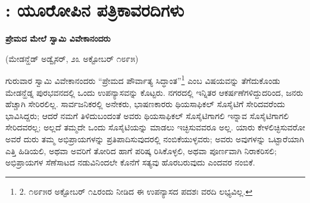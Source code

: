 
\chapter{: ಯೂರೋಪಿನ ಪತ್ರಿಕಾವರದಿಗಳು}

\begin{center}
\textbf{ಪ್ರೇಮದ ಮೇಲೆ ಸ್ವಾಮಿ ವಿವೇಕಾನಂದರು}
\end{center}

\begin{center}
(ಮೇಡನ್ಹೆಡ್ ಅಡ್ವೈಸರ್, ೨೩ ಅಕ್ಟೋಬರ್ ೧೮೯೫)
\end{center}

ಗುರುವಾರ ಸ್ವಾಮಿ ವಿವೇಕಾನಂದರು “ಪ್ರೇಮದ ಪೌರ್ವಾತ್ಯ ಸಿದ್ಧಾಂತ”\footnote{2. ೧೮೯೫ರ ಅಕ್ಟೋಬರ್ ೧೭ರಂದು ನೀಡಿದ ಈ ಉಪನ್ಯಾಸದ ಪದಶಃ ವರದಿ ಲಭ್ಯವಿಲ್ಲ.} ಎಂಬ ವಿಷಯವನ್ನು ತೆಗೆದುಕೊಂಡು ಮೇಡನ್ಹೆಡ್ನ ಪುರಭವನದಲ್ಲಿ ಒಂದು ಉಪನ್ಯಾಸವನ್ನು ಕೊಟ್ಟರು. ನಗರದಲ್ಲಿ ಇನ್ನಿತರ ಆಕರ್ಷಣೆಗಳಿದ್ದುದರಿಂದ, ಜನರು ಹೆಚ್ಚಾಗಿ ಸೇರಿರಲಿಲ್ಲ. ಸಾರ್ವಜನಿಕರಲ್ಲಿ ಅನೇಕರು, ಭಾಷಣಕಾರರು ಥಿಯಸಾಫಿಕಲ್ ಸೊಸೈಟಿಗೆ ಸೇರಿದವರೆಂದು ಭಾವಿಸಿದ್ದರು; ಆದರೆ ನಮಗೆ ತಿಳಿದುಬಂದಂತೆ ಅವರು ಥಿಯಸಾಫಿಕಲ್ ಸೊಸೈಟಿಗಾಗಲಿ ಇನ್ನಾವ ಸೊಸೈಟಿಗಾಗಲಿ ಸೇರಿದವರಲ್ಲ; ಅಲ್ಲದೆ ತಮ್ಮದೇ ಒಂದು ಸೊಸೈಟಿಯನ್ನು ಮಾಡಲು ಇಚ್ಛಿಸುವವರೂ ಅಲ್ಲ. ಯಾರು ಕೇಳಲಿಚ್ಛಿಸುವರೋ ಅವರೆ ದುರು ತಮ್ಮ ಅಭಿಪ್ರಾಯಗಳನ್ನು ಪ್ರತಿಪಾದಿಸುವುದರಲ್ಲಿ ನಂಬಿಕೆಯುಳ್ಳವರು; ಅವರು ಅವುಗಳನ್ನು ಒಟ್ಟಾರೆಯಾಗಿ ಎತ್ತಿ ಹಿಡಿಯಲಿ, ಅಥವಾ ಅವರಿಗೆ ತೋರಿದ ಹಾಗೆ ಪರಿಷ್ಕ ರಿಸಿಕೊಳ್ಳಲಿ, ಅಥವಾ ಪೂರ್ಣವಾಗಿ ನಿರಾಕರಿಸಲಿ; ಅಭಿಪ್ರಾಯಗಳ ಸೆಣೆಸಾಟದ ನಡುವಿನಿಂದಲೇ ಕೊನೆಗೆ ಸತ್ಯವು ಹೊರಬರುವುದು ಎಂದವರ ನಂಬಿಕೆ.

